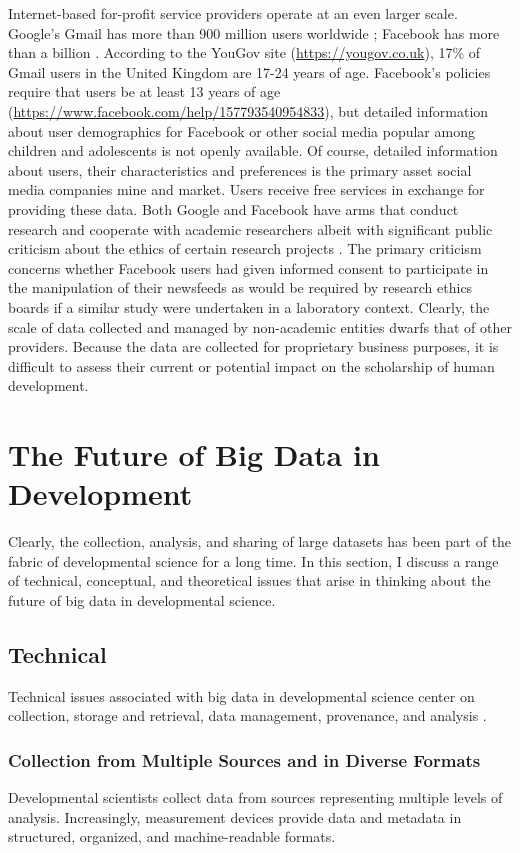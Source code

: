 \documentclass[letterpaper,man,apacite,natbib]{apa6}
\begin{document}
Internet-based for-profit service providers operate at an even larger scale.
Google's Gmail has more than 900 million users worldwide \cite{lardinois_gmail_2015}; Facebook has more than a billion \cite{facebook_2014}.
According to the YouGov site (\url{https://yougov.co.uk}), 17\% of Gmail users in the United Kingdom are 17-24 years of age.
Facebook's policies require that users be at least 13 years of age (\url{https://www.facebook.com/help/157793540954833}), but detailed information about user demographics for Facebook or other social media popular among children and adolescents is not openly available.
Of course, detailed information about users, their characteristics and preferences is the primary asset social media companies mine and market.
Users receive free services in exchange for providing these data.
Both Google and Facebook have arms that conduct research and cooperate with academic researchers albeit with significant public criticism about the ethics of certain research projects \cite{meyer_everything_2014}.
The primary criticism concerns whether Facebook users had given informed consent to participate in the manipulation of their newsfeeds as would be required by research ethics boards if a similar study were undertaken in a laboratory context.
Clearly, the scale of data collected and managed by non-academic entities dwarfs that of other providers.
Because the data are collected for proprietary business purposes, it is difficult to assess their current or potential impact on the scholarship of human development.

\section{The Future of Big Data in Development}
Clearly, the collection, analysis, and sharing of large datasets has been part of the fabric of developmental science for a long time.
In this section, I discuss a range of technical, conceptual, and theoretical issues that arise in thinking about the future of big data in developmental science. 
\subsection{Technical}
Technical issues associated with big data in developmental science center on collection, storage and retrieval, data management, provenance, and analysis \cite{goodman_ten_2014}. 
\subsubsection{Collection from Multiple Sources and in Diverse Formats}
Developmental scientists collect data from sources representing multiple levels of analysis.
Increasingly, measurement devices provide data and metadata in structured, organized, and machine-readable formats.
\end{document}

